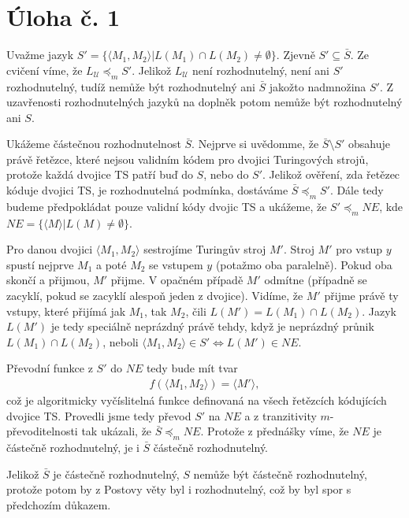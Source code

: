 \documentclass{scrartcl}
\begin{document}
    \section*{Úloha č. 1}
    Uvažme jazyk $S' = \{\langle M_1,M_2 \rangle \vert L(M_1) \cap L(M_2) \neq \emptyset \}$. Zjevně $S' \subseteq \bar{S}$. Ze cvičení víme, že $L_{\mathcal{U}} \preceq_m S'$. Jelikož $L_{\mathcal{U}}$ není rozhodnutelný, není ani $S'$ rozhodnutelný, tudíž nemůže být rozhodnutelný ani $\bar{S}$ jakožto nadmnožina $S'$. Z uzavřenosti rozhodnutelných jazyků na doplněk potom nemůže být rozhodnutelný ani $S$.

    Ukážeme částečnou rozhodnutelnost $\bar{S}$. Nejprve si uvědomme, že $\bar{S} \setminus S'$ obsahuje právě řetězce, které nejsou validním kódem pro dvojici Turingových strojů, protože každá dvojice TS patří buď do $S$, nebo do $S'$. Jelikož ověření, zda řetězec kóduje dvojici TS, je rozhodnutelná podmínka, dostáváme $\bar{S} \preceq_m S'$. Dále tedy budeme předpokládat pouze validní kódy dvojic TS a ukážeme, že $S' \preceq_m NE$, kde $NE = \{\langle M\rangle \vert L(M) \neq \emptyset\}$.

    Pro danou dvojici $\langle M_1, M_2\rangle$ sestrojíme Turingův stroj $M'$. Stroj $M'$ pro vstup $y$ spustí nejprve $M_1$ a poté $M_2$ se vstupem $y$ (potažmo oba paralelně). Pokud oba skončí a přijmou, $M'$ přijme. V opačném případě $M'$ odmítne (případně se zacyklí, pokud se zacyklí alespoň jeden z dvojice). Vidíme, že $M'$ přijme právě ty vstupy, které přijímá jak $M_1$, tak $M_2$, čili $L(M') = L(M_1) \cap L(M_2)$. Jazyk $L(M')$ je tedy speciálně neprázdný právě tehdy, když je neprázdný průnik $L(M_1) \cap L(M_2)$, neboli $\langle M_1, M_2\rangle \in S' \Leftrightarrow L(M') \in NE$.

    Převodní funkce z $S'$ do $NE$ tedy bude mít tvar
    \begin{align*}
        f(\langle M_1, M_2\rangle) = \langle M'\rangle,
    \end{align*}
    což je algoritmicky vyčíslitelná funkce definovaná na všech řetězcích kódujících dvojice TS. Provedli jsme tedy převod $S'$ na $NE$ a z tranzitivity $m$-převoditelnosti tak ukázali, že $\bar{S} \preceq_m NE$. Protože z přednášky víme, že $NE$ je částečně rozhodnutelný, je i $\bar{S}$ částečně rozhodnutelný.

    Jelikož $\bar{S}$ je částečně rozhodnutelný, $S$ nemůže být částečně rozhodnutelný, protože potom by z Postovy věty byl i rozhodnutelný, což by byl spor s předchozím důkazem.
\end{document}
